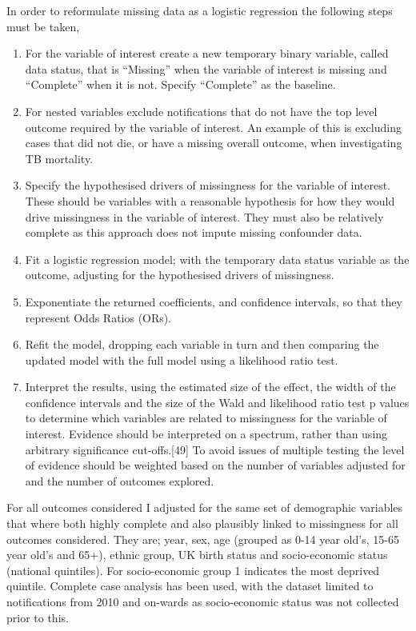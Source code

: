 \documentclass[11pt,twoside]{bristolthesis}
\begin{document}
  In order to reformulate missing data as a logistic regression the following steps must be taken,
  \begin{enumerate}
  \def\labelenumi{\arabic{enumi}.}
  \item
    For the variable of interest create a new temporary binary variable, called data status, that is ``Missing'' when the variable of interest is missing and ``Complete'' when it is not. Specify ``Complete'' as the baseline.
  \item
    For nested variables exclude notifications that do not have the top level outcome required by the variable of interest. An example of this is excluding cases that did not die, or have a missing overall outcome, when investigating TB mortality.
  \item
    Specify the hypothesised drivers of missingness for the variable of interest. These should be variables with a reasonable hypothesis for how they would drive missingness in the variable of interest. They must also be relatively complete as this approach does not impute missing confounder data.
  \item
    Fit a logistic regression model; with the temporary data status variable as the outcome, adjusting for the hypothesised drivers of missingness.
  \item
    Exponentiate the returned coefficients, and confidence intervals, so that they represent Odds Ratios (ORs).
  \item
    Refit the model, dropping each variable in turn and then comparing the updated model with the full model using a likelihood ratio test.
  \item
    Interpret the results, using the estimated size of the effect, the width of the confidence intervals and the size of the Wald and likelihood ratio test p values to determine which variables are related to missingness for the variable of interest. Evidence should be interpreted on a spectrum, rather than using arbitrary significance cut-offs.{[}49{]} To avoid issues of multiple testing the level of evidence should be weighted based on the number of variables adjusted for and the number of outcomes explored.
  \end{enumerate}
  For all outcomes considered I adjusted for the same set of demographic variables that where both highly complete and also plausibly linked to missingness for all outcomes considered. They are; year, sex, age (grouped as 0-14 year old's, 15-65 year old's and 65+), ethnic group, UK birth status and socio-economic status (national quintiles). For socio-economic group 1 indicates the most deprived quintile. Complete case analysis has been used, with the dataset limited to notifications from 2010 and on-wards as socio-economic status was not collected prior to this.
  
\end{document}
